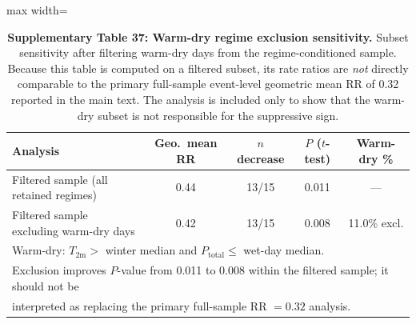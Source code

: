 \documentclass[11pt,letterpaper]{article}
\begin{document}
\begin{table}[h!]
\centering
\caption{\textbf{Supplementary Table 37: Warm-dry regime exclusion sensitivity.} Subset sensitivity after filtering warm-dry days from the regime-conditioned sample. Because this table is computed on a filtered subset, its rate ratios are \emph{not} directly comparable to the primary full-sample event-level geometric mean RR of 0.32 reported in the main text. The analysis is included only to show that the warm-dry subset is not responsible for the suppressive sign.}
\label{tab:warm_dry_excl}
\begin{adjustbox}{max width=\textwidth}
\begin{tabular}{lcccc}
\toprule
Analysis & Geo.\ mean RR & $n$ decrease & $P$ ($t$-test) & Warm-dry \% \\
\midrule
Filtered sample (all retained regimes) & 0.44 & 13/15 & 0.011 & --- \\
Filtered sample excluding warm-dry days & 0.42 & 13/15 & 0.008 & 11.0\% excl. \\
\bottomrule
\multicolumn{5}{l}{\footnotesize Warm-dry: $T_{\mathrm{2m}} > $ winter median and $P_{\mathrm{total}} \leq$ wet-day median.} \\
\multicolumn{5}{l}{\footnotesize Exclusion improves $P$-value from 0.011 to 0.008 within the filtered sample; it should not be} \\
\multicolumn{5}{l}{\footnotesize interpreted as replacing the primary full-sample RR $= 0.32$ analysis.} \\
\end{tabular}
\end{adjustbox}
\end{table}
\end{document}
